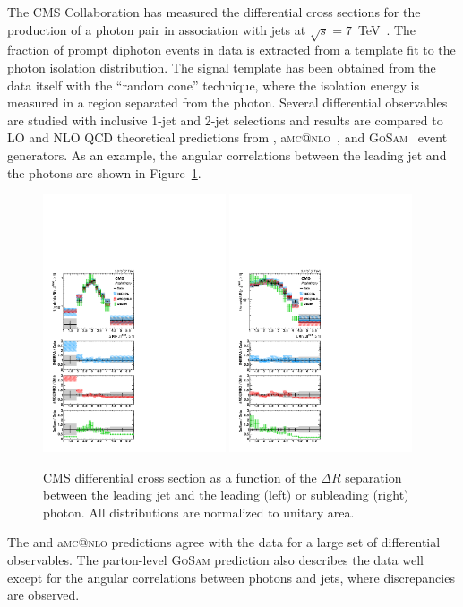 \documentclass{PoS}
\makeatletter
\newcommand{\AMCATNLO} {a{\textsc{mc@nlo}}\xspace}
\newcommand{\GOSAM} {{\textsc{GoSam}}\xspace}
\makeatother
\begin{document}
The CMS Collaboration has measured the differential cross sections for the production of a photon pair in association with
jets at $\sqrt{s}=7$~TeV~\cite{CMS:2015hha}. The fraction of prompt diphoton events in data is extracted from a template fit to the photon
isolation distribution. The signal template has been obtained from the data itself with the ``random cone''
technique, where the isolation energy is measured in a region separated from the photon. Several differential observables are
studied with inclusive 1-jet and 2-jet selections and results are compared to LO and NLO QCD theoretical predictions
from \SHERPA, \AMCATNLO~\cite{Alwall:2014hca}, and \GOSAM~\cite{Gehrmann:2013aga} event generators. As an example, the
angular correlations between the leading jet and the photons are shown in Figure~\ref{fig:diphot}. 
\begin{figure}
\begin{center}
\includegraphics[width=0.48\textwidth]{Figure13a.pdf}
\includegraphics[width=0.48\textwidth]{Figure13b.pdf}
\caption{CMS differential cross section as a function of the $\Delta R$ separation between the leading jet and the leading (left) or subleading (right) photon. All distributions are normalized to unitary area.}
\label{fig:diphot}
\end{center}
\end{figure}
The \SHERPA and
\AMCATNLO predictions agree with the data for a large set of differential 
observables. The parton-level \GOSAM prediction also describes the data well except for the angular correlations between
photons and jets, where discrepancies are observed.
\end{document}

